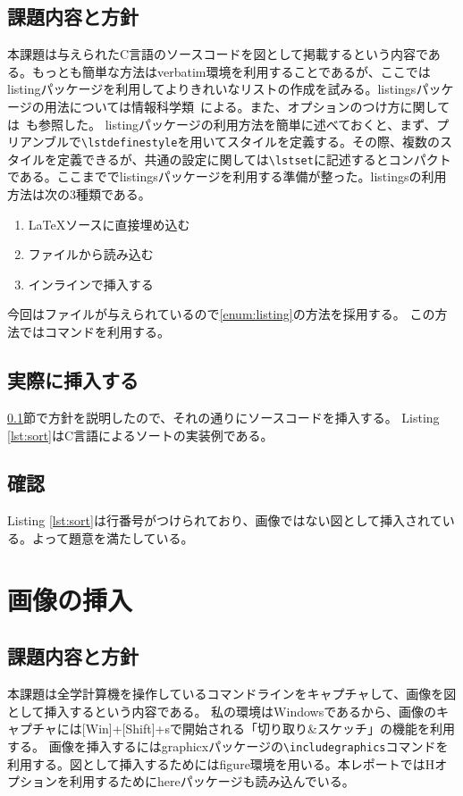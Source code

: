 \documentclass[dvipdfmx,12pt,a4j]{jarticle}
\begin{document}
\subsection{課題内容と方針}\label{sec:code}
本課題は与えられたC言語のソースコードを図として掲載するという内容である。もっとも簡単な方法はverbatim環境を利用することであるが、ここではlistingパッケージを利用してよりきれいなリストの作成を試みる。listingsパッケージの用法については情報科学類~\cite[p.183]{tebiki}による。また、オプションのつけ方に関しては~\cite{listing}も参照した。
listingパッケージの利用方法を簡単に述べておくと、まず、プリアンブルで\verb|\lstdefinestyle|を用いてスタイルを定義する。その際、複数のスタイルを定義できるが、共通の設定に関しては\verb|\lstset|に記述するとコンパクトである。ここまででlistingsパッケージを利用する準備が整った。listingsの利用方法は次の3種類である。
\begin{enumerate}
  \item \LaTeX ソースに直接埋め込む
  \item ファイルから読み込む \label{enum:listing}
  \item インラインで挿入する
\end{enumerate}
今回はファイルが与えられているので\ref{enum:listing}の方法を採用する。
この方法では\verb||コマンドを利用する。

\subsection{実際に挿入する}
\ref{sec:code}節で方針を説明したので、それの通りにソースコードを挿入する。
Listing \ref{lst:sort}はC言語によるソートの実装例である。

\subsection{確認}
Listing \ref{lst:sort}は行番号がつけられており、画像ではない図として挿入されている。よって題意を満たしている。

\section{画像の挿入}
\subsection{課題内容と方針}\label{subsection:方針}

本課題は全学計算機を操作しているコマンドラインをキャプチャして、画像を図として挿入するという内容である。
私の環境はWindowsであるから、画像のキャプチャには[Win]+[Shift]+sで開始される「切り取り\&スケッチ」の機能を利用する。
画像を挿入するにはgraphicxパッケージの\verb|\includegraphics|コマンドを利用する。図として挿入するためにはfigure環境を用いる。本レポートではHオプションを利用するためにhereパッケージも読み込んでいる。
\end{document}
